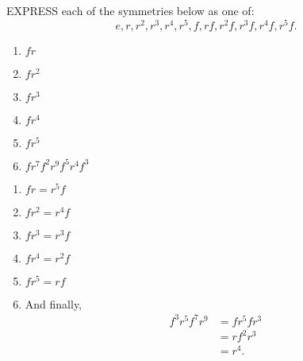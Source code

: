\documentclass[noauthor,nooutcomes,hints,handout]{ximera}
\begin{document}
\begin{question}
 EXPRESS each of the symmetries below as one of:
 \[
 e,r,r^2,r^3,r^4,r^5,f,rf,r^2f,r^3f, r^4f,r^5f.
 \]

 \begin{enumerate}
 \item $fr$
 \item $fr^2$
 \item $fr^3$
 \item $fr^4$
 \item $fr^5$
 \item $fr^7f^2r^9f^5r^4f^3$
 \end{enumerate}
 \begin{freeResponse}
   \begin{enumerate}
   \item $fr = r^5f$
   \item $fr^2 = r^4f$
   \item $fr^3 = r^3f$
   \item $fr^4 = r^2f$
   \item $fr^5 = rf$
   \item And finally,
     \begin{align*}
    f^3r^5f^7r^9 &= fr^5fr^3\\
    &= rf^2r^3\\
    &= r^4.
     \end{align*}
   \end{enumerate}
 \end{freeResponse}
\end{question}
\end{document}
